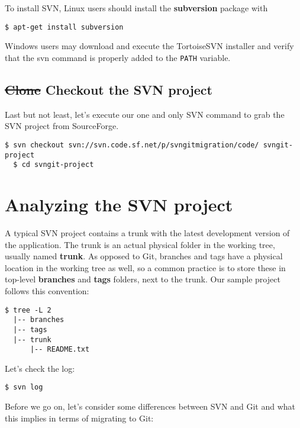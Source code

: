 \documentclass{../common/tufte-latex/tufte-handout}
\begin{document}
To install SVN, Linux users should install the \textbf{subversion} package with

\begin{lstlisting}[style=BashInputStyle]
  $ apt-get install subversion
\end{lstlisting}

Windows users may download and execute the TortoiseSVN installer and verify that the svn command is properly added to the \texttt{PATH} variable.

\subsection{\st{Clone} Checkout the SVN project}

Last but not least, let's execute our one and only SVN command to grab the SVN project from SourceForge.

\begin{lstlisting}[style=BashInputStyle]
  $ svn checkout svn://svn.code.sf.net/p/svngitmigration/code/ svngit-project
  $ cd svngit-project
\end{lstlisting}

\section{Analyzing the SVN project}

A typical SVN project contains a trunk with the latest development version of the application.
The trunk is an actual physical folder in the working tree, usually named \textbf{trunk}.
As opposed to Git, branches and tags have a physical location in the working tree as well, so a common practice is to store these in top-level \textbf{branches} and \textbf{tags} folders, next to the trunk.
Our sample project follows this convention:

\begin{lstlisting}[style=BashInputStyle]
  $ tree -L 2
  |-- branches
  |-- tags
  |-- trunk
      |-- README.txt
\end{lstlisting}

Let's check the log:

\begin{lstlisting}[style=BashInputStyle]
  $ svn log
\end{lstlisting}

Before we go on, let's consider some differences between SVN and Git and what this implies in terms of migrating to Git:
\end{document}
